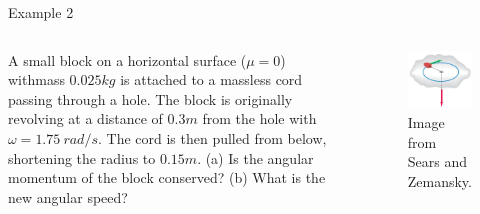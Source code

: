 \documentclass[]{beamer}
\begin{document}








\begin{frame}

Example 2
  \vspace{7mm}


  \begin{columns}[c]
    \column{2.2in}  %
   

    A small block on a
 horizontal surface ($\mu=0$)
withmass  $0.025kg$ is
attached to a massless cord passing
through a hole. The block is originally
revolving at a distance of
$0.3m$ from the hole with $\omega = 1.75~rad/s$. The
cord is then pulled from below,
shortening the radius 
to $0.15 m$. (a) Is the angular momentum
of the block conserved? (b) What is the new
angular speed? 


    \column{2in}
 


    \begin{figure}[h!]  
      \includegraphics[width=1.1\textwidth]{images/17.jpg}
      \caption{Image from Sears and Zemansky.}
    \end{figure}



    \end{columns}





  \end{frame}
\end{document}
